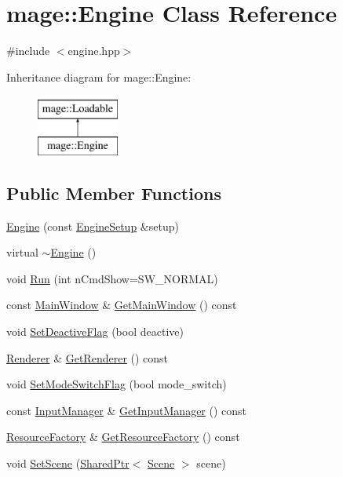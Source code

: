 \hypertarget{classmage_1_1_engine}{}\section{mage\+:\+:Engine Class Reference}
\label{classmage_1_1_engine}


{\ttfamily \#include $<$engine.\+hpp$>$}

Inheritance diagram for mage\+:\+:Engine\+:\begin{figure}[H]
\begin{center}
\leavevmode
\includegraphics[height=2.000000cm]{classmage_1_1_engine}
\end{center}
\end{figure}
\subsection*{Public Member Functions}
\begin{DoxyCompactItemize}
\item 
\hyperlink{classmage_1_1_engine_a99770cbb017b29c284d7f8e4c7e2b84c}{Engine} (const \hyperlink{structmage_1_1_engine_setup}{Engine\+Setup} \&setup)
\item 
virtual \hyperlink{classmage_1_1_engine_a34628556f8397d70ed018d71e343c2f5}{$\sim$\+Engine} ()
\item 
void \hyperlink{classmage_1_1_engine_a246c82d0e55bc29e73aecbc365464ec8}{Run} (int n\+Cmd\+Show=S\+W\+\_\+\+N\+O\+R\+M\+AL)
\item 
const \hyperlink{classmage_1_1_main_window}{Main\+Window} \& \hyperlink{classmage_1_1_engine_a3bfc843926e0870cd5b8d512fb392607}{Get\+Main\+Window} () const
\item 
void \hyperlink{classmage_1_1_engine_a942bfa9892fa79bb1068d7c7ec4e6732}{Set\+Deactive\+Flag} (bool deactive)
\item 
\hyperlink{classmage_1_1_renderer}{Renderer} \& \hyperlink{classmage_1_1_engine_a42a90a61ede031ee768b8aa6d7f808ae}{Get\+Renderer} () const
\item 
void \hyperlink{classmage_1_1_engine_a8b574f0d702240d76fa98b2c79856d0d}{Set\+Mode\+Switch\+Flag} (bool mode\+\_\+switch)
\item 
const \hyperlink{classmage_1_1_input_manager}{Input\+Manager} \& \hyperlink{classmage_1_1_engine_a728ad054d36cee8eaf9ee3eb6c1e1201}{Get\+Input\+Manager} () const
\item 
\hyperlink{classmage_1_1_resource_factory}{Resource\+Factory} \& \hyperlink{classmage_1_1_engine_a1a18dc9775f6ab4c9cd103b07ad47903}{Get\+Resource\+Factory} () const
\item 
void \hyperlink{classmage_1_1_engine_aec75ed67f8fb68a383fa892e50b21ea7}{Set\+Scene} (\hyperlink{namespacemage_a1e01ae66713838a7a67d30e44c67703e}{Shared\+Ptr}$<$ \hyperlink{classmage_1_1_scene}{Scene} $>$ scene)
\end{DoxyCompactItemize}
